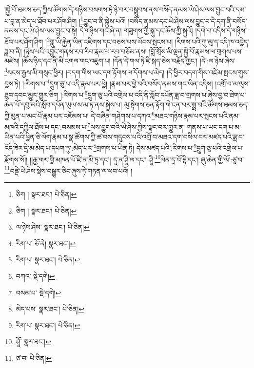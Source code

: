 །སྐྱེ་བོ་ཐམས་ཅད་ཀྱིས་ཚོགས་དེ་གཉིས་བསགས་ཏེ་ཉེ་བར་བསྒྲུབས་ནས་བསོད་ནམས་ཡེ་ཤེས་ལས་བྱུང་བའི་དམ་པ་བླ་ན་མེད་པ་ཐོབ་པར་ཤོག་ཤིག །\footnote{ཅིག །  སྣར་ཐང་།  པེ་ཅིན། }བྱུང་བ་ནི་སྐྱེས་པའོ། །བསོད་ནམས་དང་ཡེ་ཤེས་ལས་བྱུང་བ་དེ་དག་ནི་བསོད་ནམས་དང་ཡེ་ཤེས་ལས་བྱུང་བ་སྟེ། དེ་གཉིས་གང་ཞེ་ན། གཟུགས་ཀྱི་སྐུ་དང་ཆོས་ཀྱི་སྐུའོ། །དགེ་བ་འདིས་དེ་གཉིས་ཐོབ་པར་ཤོག་ཤིག །\footnote{ཅིག །  སྣར་ཐང་།  པེ་ཅིན། }ཀླུ་ཡི་རྐྱེན་ཡིན་འཇིགས་དང་བཅས་པས་ཡོངས་སྤངས་པ། །རིགས་པའི་ཀུ་མུ་ད་འདི་ཁ་འབྱེད་ཟླ་བ་ནི། །ཉེས་པའི་འབྱུང་གནས་རབ་རིབ་རྣམ་པ་རབ་བཅོམ་ནས། །བློ་གྲོས་མི་ལྡན་སྐྱེ་བོ་རྣམས་ལ་གྲགས་པས་མཛེས། །ཆོས་ཉིད་དང་ནི་མི་འགལ་གང་འཇུག་པ། །དོན་དེ་གལ་ཏེ་ཇི་སྐད་ཅེས་བརྗོད་ཀྱང་། །དེ་:ལ་ཉེས་ཞེས་\footnote{ལ་ཉེས་ཤེས་  སྣར་ཐང་།  པེ་ཅིན། }སངས་རྒྱས་མི་གསུང་ཕྱིར། །བདག་གིས་ཡང་དག་རྟོགས་ལ་དོགས་པ་མེད། །དེ་ཕྱིར་བདག་གིས་འཛེམ་སྤངས་གུས་བྱས་ཏེ། །:རིགས་པ་\footnote{རིག་པ་  ཅོ་ནེ།  སྣར་ཐང་། }དྲུག་ཅུ་པ་འདི་རྣམ་པར་ཕྱེ། །རྣམ་པར་ཕྱེ་བའི་བསོད་ནམས་གང་ཡིན་འདིས། །འགྲོ་བ་མ་ལུས་ཐུབ་དབང་མྱུར་གྱུར་ཅིག །:རིགས་པ་\footnote{རིག་པ་  སྣར་ཐང་།  པེ་ཅིན། }དྲུག་ཅུ་པའི་འགྲེལ་པ་འདི་ནི་སློབ་དཔོན་ཟླ་བ་གྲགས་པ་ཞེས་བྱ་བ་ཐེག་པ་ཆེན་པོ་དབུ་མའི་སློབ་དཔོན་ཡུལ་ས་མ་ཏ་ནས་སྐྱེས་པ། མུ་སྟེགས་ཅན་རྟོག་གེ་ངན་པར་སྨྲ་བའི་ཚོགས་ཐམས་ཅད་ཀྱི་མུན་པ་མང་པོ་རྣམ་པར་འཇོམས་པ། དེ་བཞིན་གཤེགས་པ་དཀའ་\footnote{བཀའ་  སྡེ་དགེ། }མཐའ་གཉིས་རྣམ་པར་སྤངས་པའི་ནམ་མཁའི་དཀྱིལ་ཐོས་པ་དང་:བསམས་པ་\footnote{བསམ་པ་  སྡེ་དགེ། }ལས་བྱུང་བའི་ཡེ་ཤེས་ཀྱིས་སྣང་བར་གྱུར་ན། གནས་པ་ཡང་དག་པ་མ་ཡིན་པའི་ཕྱིན་ཅི་ལོག་རྣམ་པ་སྣ་ཚོགས་ཀྱི་ཚ་བས་གདུངས་པའི་འགྲོ་བ་མཐའ་དག་བསིལ་བར་མཛད་པའི་ཟླ་བ་འོད་ཟེར་དྲི་མ་མེད་པ་དཔག་ཏུ་:མེད་པར་\footnote{མེད་པས་  སྣར་ཐང་།  པེ་ཅིན། }གྲགས་པ་ཡིན་ཏེ། དེས་མཛད་པའི་:རིགས་པ་\footnote{རིག་པ་  སྣར་ཐང་།  པེ་ཅིན། }དྲུག་ཅུ་པའི་འགྲེལ་པ་རྫོགས་སོ།། །།རྒྱ་གར་གྱི་མཁན་པོ་ཛི་ན་མི་ཏྲ་དང་། དཱ་ན་ཤཱི་ལ་དང་། ཤཱི་\footnote{ཤཱོ་  སྣར་ཐང་། }ལེན་དྲ་བོ་དྷི་དང་། ཞུ་ཆེན་གྱི་ལོ་:ཙཱ་བ་\footnote{ཙ་བ་  པེ་ཅིན། }བནྡེ་ཡེ་ཤེས་སྡེས་བསྒྱུར་ཅིང་ཞུས་ཏེ་གཏན་ལ་ཕབ་པའོ། ། 